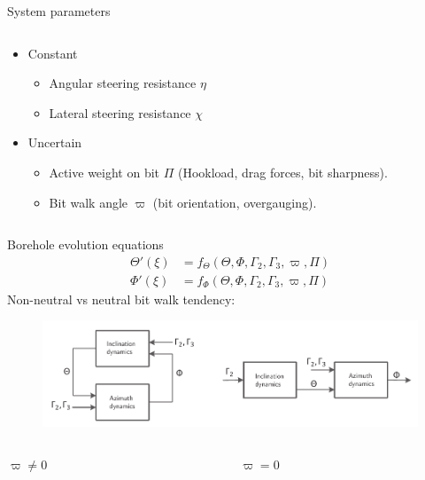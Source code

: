 \documentclass{beamer}
\begin{document}
\begin{frame}{System parameters}
\begin{columns}[T]
\begin{column}{0.5\textwidth}
			\vspace{1cm}\begin{itemize}\setlength\itemsep{2.5em}
				\item Constant
						\begin{itemize}\setlength\itemsep{1em}
							\item Angular steering resistance $\eta$
							\item Lateral steering resistance $\chi$
						\end{itemize}
				\item Uncertain
				\begin{itemize} \setlength\itemsep{1em}
					\item Active weight on bit $\Pi$ (Hookload, drag forces, bit sharpness).
				\item Bit walk angle $\varpi$ (bit orientation, overgauging).
					\end{itemize}
			\end{itemize}
		\end{column}
	\end{columns}
\end{frame}

\begin{frame}{Borehole evolution equations}
		\begin{align*}
		\Theta'(\xi) &= f_\Theta (\Theta,\Phi,\Gamma_2,\Gamma_3,\varpi,\Pi) \\
		\Phi'(\xi) &= f_\Phi (\Theta,\Phi,\Gamma_2,\Gamma_3,\varpi,\Pi)
		\end{align*}
		Non-neutral vs neutral bit walk tendency:
		\begin{figure}[ht]\centering
				\includegraphics[width=1\textwidth]{images/ModelComparison.pdf}
		\end{figure}
		\begin{columns}[T]
				\begin{column}{0.47\textwidth}\centering
					\LARGE$\varpi \ne 0$
				\end{column}
				\begin{column}{0.47\textwidth}\centering
					\LARGE$\varpi = 0$
				\end{column}
		\end{columns}
\end{frame}
\end{document}
